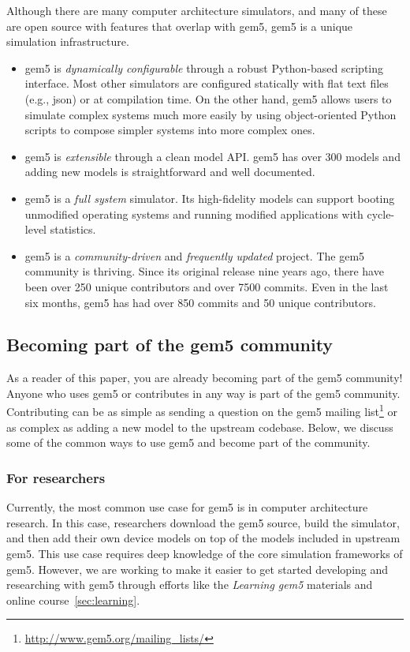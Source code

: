 Although there are many computer architecture simulators, and many of these are open source with features that overlap with gem5, gem5 is a unique simulation infrastructure.
\begin{itemize}
    \item gem5 is \emph{dynamically configurable} through a robust Python-based scripting interface. Most other simulators are configured statically with flat text files (e.g., json) or at compilation time. On the other hand, gem5 allows users to simulate complex systems much more easily by using object-oriented Python scripts to compose simpler systems into more complex ones.
    \item gem5 is \emph{extensible} through a clean model API. gem5 has over 300 models and adding new models is straightforward and well documented.
    \item gem5 is a \emph{full system} simulator. Its high-fidelity models can support booting unmodified operating systems and running modified applications with cycle-level statistics.
    \item gem5 is a \emph{community-driven} and \emph{frequently updated} project. The gem5 community is thriving. Since its original release nine years ago, there have been over 250 unique contributors and over 7500 commits. Even in the last six months, gem5 has had over 850 commits and 50 unique contributors.
\end{itemize}

\subsection{Becoming part of the gem5 community}

As a reader of this paper, you are already becoming part of the gem5 community!
Anyone who uses gem5 or contributes in any way is part of the gem5 community.
Contributing can be as simple as sending a question on the gem5 mailing list\footnote{\url{http://www.gem5.org/mailing_lists/}} or as complex as adding a new model to the upstream codebase.
Below, we discuss some of the common ways to use gem5 and become part of the community.

\subsubsection{For researchers}

Currently, the most common use case for gem5 is in computer architecture research.
In this case, researchers download the gem5 source, build the simulator, and then add their own device models on top of the models included in upstream gem5.
This use case requires deep knowledge of the core simulation frameworks of gem5.
However, we are working to make it easier to get started developing and researching with gem5 through efforts like the \emph{Learning gem5} materials and online course~\ref{sec:learning}.

